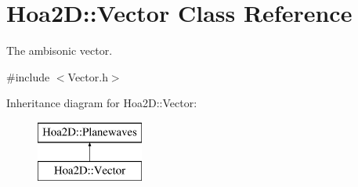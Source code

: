 \hypertarget{class_hoa2_d_1_1_vector}{\section{Hoa2\-D\-:\-:Vector Class Reference}
\label{class_hoa2_d_1_1_vector}
}


The ambisonic vector.  




{\ttfamily \#include $<$Vector.\-h$>$}

Inheritance diagram for Hoa2\-D\-:\-:Vector\-:\begin{figure}[H]
\begin{center}
\leavevmode
\includegraphics[height=2.000000cm]{class_hoa2_d_1_1_vector}
\end{center}
\end{figure}
